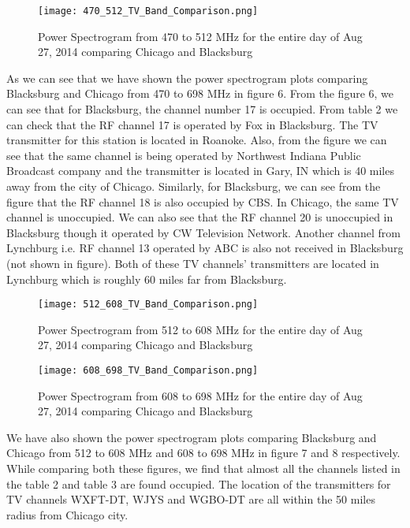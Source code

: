 \documentclass[12pt,sts]{report}
\begin{document}
	\begin{figure}[ht!]
		\centering
			\texttt{[image: 470\_512\_TV\_Band\_Comparison.png]}
		\caption{Power Spectrogram from 470 to 512 MHz for the entire day of Aug 27, 2014 comparing Chicago and Blacksburg}
	\end{figure}
	
	As we can see that we have shown the power spectrogram plots comparing Blacksburg and Chicago from 470 to 698 MHz in figure 6. From the figure 6, we can see that for Blacksburg, the channel number 17 is occupied. From table 2 we can check that the RF channel 17 is operated by Fox in Blacksburg. The TV transmitter for this station is located in Roanoke. Also, from the figure we can see that the same channel is being operated by Northwest Indiana Public Broadcast company and the transmitter is located in Gary, IN which is 40 miles away from the city of Chicago. 
	Similarly, for Blacksburg, we can see from the figure that the RF channel 18 is also occupied by CBS. In Chicago, the same TV channel is unoccupied. We can also see that the RF channel 20 is unoccupied in Blacksburg though it operated by CW Television Network. Another channel from Lynchburg i.e. RF channel 13 operated by ABC is also not received in Blacksburg (not shown in figure). Both of these TV channels' transmitters are located in Lynchburg which is roughly 60 miles far from Blacksburg. 
	
	\begin{figure}[ht!]
		\centering
			\texttt{[image: 512\_608\_TV\_Band\_Comparison.png]}
		\caption{Power Spectrogram from 512 to 608 MHz for the entire day of Aug 27, 2014 comparing Chicago and Blacksburg}
	\end{figure}
	
	\begin{figure}[ht!]
		\centering
			\texttt{[image: 608\_698\_TV\_Band\_Comparison.png]}
		\caption{Power Spectrogram from 608 to 698 MHz for the entire day of Aug 27, 2014 comparing Chicago and Blacksburg}
	\end{figure}
	
	We have also shown the power spectrogram plots comparing Blacksburg and Chicago from 512 to 608 MHz and 608 to 698 MHz in figure 7 and 8 respectively. While comparing both these figures, we find that almost all the channels listed in the table 2 and table 3 are found occupied. The location of the transmitters for TV channels WXFT-DT, WJYS and WGBO-DT are all within the 50 miles radius from Chicago city.
	
\end{document}
